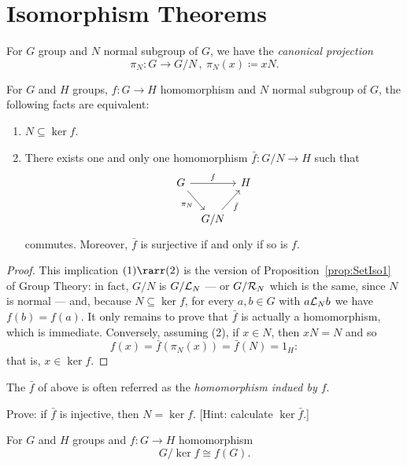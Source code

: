 
\section{Isomorphism Theorems}

For \(G\) group and \(N\) normal subgroup of \(G\), we have the {\em canonical projection}
\[\pi_N : G \to G/N\,, \ \pi_N(x) \coloneq xN .\]

\begin{lemma}\label{lemma:GrpIso0}
For \(G\) and \(H\) groups, \(f : G \to H\) homomorphism and \(N\) normal subgroup of \(G\), the following facts are equivalent:
\begin{enumerate}
\item \(N \subseteq \ker f\).
\item There exists one and only one homomorphism \(\bar f : G/N \to H\) such that
\[\begin{tikzcd}[column sep=tiny, ampersand replacement=\&]
G \ar["f", rr] \ar["{\pi_N}", swap, dr] \& \& H \\
\& G/N \ar["{\bar f}", swap, ur]
\end{tikzcd}\]
commutes. Moreover, \(\bar f\) is surjective if and only if so is \(f\).
\end{enumerate}
\end{lemma}

\begin{proof}
This implication \((1) \rarr (2)\) is the version of Proposition~\ref{prop:SetIso1} of Group Theory: in fact, \(G/N\) is \(G/\mathcal L_N\) --- or \(G/\mathcal R_N\) which is the same, since \(N\) is normal --- and, because \(N \subseteq \ker f\), for every \(a, b \in G\) with \(a \mathcal L_N b\) we have \(f(b) = f(a)\). It only remains to prove that \(\bar f\) is actually a homomorphism, which is immediate.\newline
Conversely, assuming (2), if \(x \in N\), then \(xN = N\) and so
\[f(x) = \bar f (\pi_N (x)) = \bar f (N) = 1_H :\]
that is, \(x \in \ker f\).
\end{proof}

The \(\bar f\) of above is often referred as the {\em homomorphism indued by \(f\)}.

\begin{exercise}
Prove: if \(\bar f\) is injective, then \(N = \ker f\). [Hint: calculate \(\ker \bar f\).]
\end{exercise}

\begin{proposition}\label{proposition:GrpIso1}
For \(G\) and \(H\) groups and \(f : G \to H\) homomorphism
\[{G}{/}{\ker f} \cong f(G) .\]
\end{proposition}

